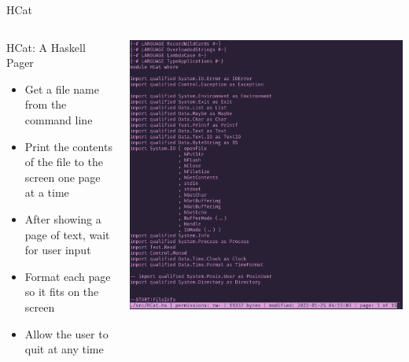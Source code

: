\documentclass[10pt, presentation, colorlinks]{beamer}
\begin{document}
\begin{frame}[label={sec:orga208038}]{HCat}
\begin{columns}
\begin{column}[t]{0.45\columnwidth}
\alert{HCat: A Haskell Pager}
\bigskip

\begin{itemize}
\item Get a file name from the command line
\item Print the contents of the file to the screen one page at a time
\item After showing a page of text, wait for user input
\item Format each page so it fits on the screen
\item Allow the user to quit at any time
\end{itemize}
\end{column}

\begin{column}[t]{0.45\columnwidth}
\begin{center}
\includegraphics[height=\textwidth]{./img/hcat-screen.png}
\end{center}
\end{column}
\end{columns}
\end{frame}
\end{document}

